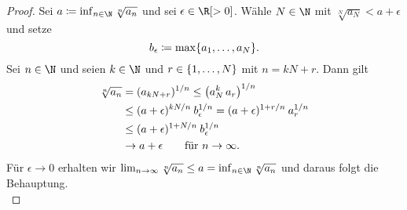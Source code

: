 \begin{proof}
    Sei $a\defeq \inf_{n\in\N} \sqrt[n]{a_n}$ und sei $\epsilon\in\R[>0]$. Wähle
    $N\in\N$ mit $\sqrt[N]{a_N} < a+\epsilon$ und setze
    \[ b_\epsilon \defeq \max\{a_1,\dots,a_N\}  . \]
    Sei $n\in\N$ und seien $k\in\N$ und $r\in\setOneto N$ mit $n=kN+r$.
    Dann gilt
    {%
    \begin{align*}
            \sqrt[n]{a_n} 
            &= (a_{kN+r})^{1/n} 
            \leq \bigl( a_N^k \, a_r \bigr)^{1/n}
            \\
            &\leq (a+\epsilon)^{kN/n} \mkern4mu b_\epsilon^{1/n}
            = (a+\epsilon)^{1+r/n} \mkern4mu a_r^{1/n}
            \\
            &\leq (a+\epsilon)^{1+N/n} \mkern4mu b_\epsilon^{1/n}
            \\
            &\to a+\epsilon \fuer n\to\infty
    . \end{align*}}
    Für $\epsilon\to0$ erhalten wir $\lim_{n\to\infty} \sqrt[n]{a_n}
    \leq a = \inf_{n\in\N} \sqrt[n]{a_n}$ und daraus folgt die Behauptung.
    \\
\end{proof}
%
